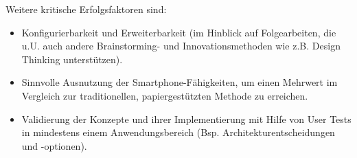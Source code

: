 Weitere kritische Erfolgsfaktoren sind:
\begin{itemize}
  \item Konfigurierbarkeit und Erweiterbarkeit (im Hinblick auf Folgearbeiten, die u.U. auch andere Brainstorming- und Innovationsmethoden wie z.B. Design Thinking unterstützen).
  \item Sinnvolle Ausnutzung der Smartphone-Fähigkeiten, um einen Mehrwert im Vergleich zur traditionellen, papiergestützten Methode zu erreichen. 
  \item Validierung der Konzepte und ihrer Implementierung mit Hilfe von User Tests in mindestens einem Anwendungsbereich (Bsp. Architekturentscheidungen und -optionen).
\end{itemize}

